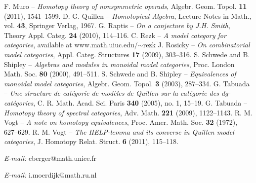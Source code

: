 \documentclass[10pt]{amsart}
\theoremstyle{plain}
\theoremstyle{remark}
\begin{document}
\begin{thebibliography}{99}
F. Muro -- \emph{Homotopy theory of nonsymmetric operads}, Algebr. Geom. Topol. \textbf{11} (2011), 1541--1599.
D. G. Quillen -- \emph{Homotopical Algebra}, Lecture Notes in Math., vol. \textbf{43}, Springer Verlag, 1967.
G. Raptis -- \emph{On a conjecture by J.H. Smith}, Theory Appl. Categ. \textbf{24} (2010), 114--116.
C. Rezk -- \emph{A model category for categories}, available at www.math.uiuc.edu/$\sim$rezk
J. Rosicky -- \emph{On combinatorial model categories}, Appl. Categ. Structures \textbf{17} (2009), 303--316.
S. Schwede and B. Shipley -- \emph{Algebras and modules in monoidal model categories}, Proc. London Math. Soc. \textbf{80} (2000), 491--511.
S. Schwede and B. Shipley -- \emph{Equivalences of monoidal model categories}, Algebr. Geom. Topol. \textbf{3} (2003), 287--334.
G. Tabuada -- \emph{Une structure de cat\'egorie de mod\`eles de Quillen sur la cat\'egorie des dg-cat\'egories}, C. R. Math. Acad. Sci. Paris \textbf{340} (2005), no. 1, 15--19.
G. Tabuada -- \emph{Homotopy theory of spectral categories}, Adv. Math. \textbf{221} (2009), 1122--1143.
R. M. Vogt -- \emph{A note on homotopy equivalences}, Proc. Amer. Math. Soc. \textbf{32} (1972), 627--629.
R. M. Vogt -- \emph{The HELP-lemma and its converse in Quillen model categories}, J. Homotopy Relat. Struct. \textbf{6} (2011), 115--118.
\end{thebibliography}\vspace{1ex}

\hspace{2em}\emph{E-mail:}
cberger$@$math.unice.fr\vspace{1ex}

\hspace{2em}\emph{E-mail:}
i.moerdijk$@$math.ru.nl
\end{document}
